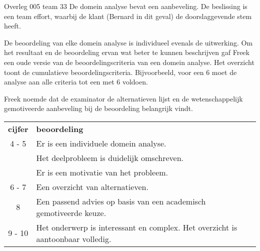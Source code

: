 \documentclass{article}
\begin{document}
\begin{Minutes}{Overleg 005 team 33}
De domein analyse bevat een aanbeveling. De beslissing is een team effort, waarbij de klant (Bernard in dit geval) de doorslaggevende stem heeft.

De beoordeling van elke domein analyse is individueel evenals de uitwerking.
Om het resultaat en de beoordeling ervan wat beter te kunnen beschrijven gaf Freek
een oude versie van de beoordelingscriteria van een domein analyse. Het overzicht
toont de cumulatieve beoordelingscriteria. Bijvoorbeeld, voor een 6 moet de analyse aan alle
criteria tot een met 6 voldoen.

Freek noemde dat de examinator de alternatieven lijst en de wetenschappelijk gemotiveerde aanbeveling bij
de beoordeling belangrijk vindt.

\begin{center}
\begin{tabular}{|c|p{30em}|}
{\bf cijfer} & {\bf beoordeling} \\
 4 - 5  & Er is een individuele domein analyse. \\
        & Het deelprobleem is duidelijk omschreven.\\
        & Er is een motivatie van het probleem.\\
 6 - 7  & Een overzicht van alternatieven. \\
 8      & Een passend advies op basis van een academisch gemotiveerde keuze.\\
 9 - 10 & Het onderwerp is interessant en complex. Het overzicht is aantoonbaar volledig.\\
\end{tabular}
\end{center}



\end{Minutes}
\end{document}
